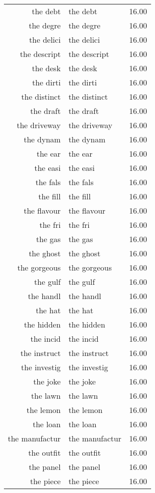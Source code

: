 \begin{table}[ht]
\begin{tabular}{rlr}
  the debt & the debt & 16.00 \\ 
  the degre & the degre & 16.00 \\ 
  the delici & the delici & 16.00 \\ 
  the descript & the descript & 16.00 \\ 
  the desk & the desk & 16.00 \\ 
  the dirti & the dirti & 16.00 \\ 
  the distinct & the distinct & 16.00 \\ 
  the draft & the draft & 16.00 \\ 
  the driveway & the driveway & 16.00 \\ 
  the dynam & the dynam & 16.00 \\ 
  the ear & the ear & 16.00 \\ 
  the easi & the easi & 16.00 \\ 
  the fals & the fals & 16.00 \\ 
  the fill & the fill & 16.00 \\ 
  the flavour & the flavour & 16.00 \\ 
  the fri & the fri & 16.00 \\ 
  the gas & the gas & 16.00 \\ 
  the ghost & the ghost & 16.00 \\ 
  the gorgeous & the gorgeous & 16.00 \\ 
  the gulf & the gulf & 16.00 \\ 
  the handl & the handl & 16.00 \\ 
  the hat & the hat & 16.00 \\ 
  the hidden & the hidden & 16.00 \\ 
  the incid & the incid & 16.00 \\ 
  the instruct & the instruct & 16.00 \\ 
  the investig & the investig & 16.00 \\ 
  the joke & the joke & 16.00 \\ 
  the lawn & the lawn & 16.00 \\ 
  the lemon & the lemon & 16.00 \\ 
  the loan & the loan & 16.00 \\ 
  the manufactur & the manufactur & 16.00 \\ 
  the outfit & the outfit & 16.00 \\ 
  the panel & the panel & 16.00 \\ 
  the piece & the piece & 16.00 \\ 

\end{tabular}
\end{table}
